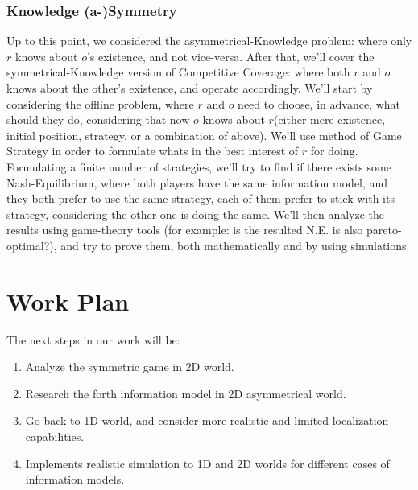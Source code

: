 \documentclass[a4paper,english,10pt]{article}
\newcommand\rob{\ensuremath{r}\xspace}
\newcommand\opp{\ensuremath{o}\xspace}
\begin{document}
\subsubsection{Knowledge (a-)Symmetry}
Up to this point, we considered the asymmetrical-Knowledge problem: where only \rob knows about \opp's existence, and not vice-versa. 
After that, we'll cover the symmetrical-Knowledge version of Competitive Coverage: where both \rob and \opp knows about the other's existence, and operate accordingly.
We'll start by considering the offline problem, where \rob and \opp need to choose, in advance, what should they do, considering that now \opp knows about \rob (either mere existence, initial position, strategy, or a combination of above).
We'll use method of Game Strategy in order to formulate whats in the best interest of \rob for doing. Formulating a finite number of strategies, we'll try to find if there exists some Nash-Equilibrium, where both players have the same information model, and they both prefer to use the same strategy, each of them prefer to stick with its strategy, considering the other one is doing the same. We'll then analyze the results using game-theory tools (for example: is the resulted N.E. is also pareto-optimal?), and try to prove them, both mathematically and by using simulations.

\section{Work Plan}
The next steps in our work will be:
\begin{enumerate}
\item Analyze the symmetric game in 2D world.
\item Research the forth information model in 2D asymmetrical world.
\item Go back to 1D world, and consider more realistic and limited localization capabilities.
\item Implements realistic simulation to 1D and 2D worlds for different cases of information models.
\end{enumerate}




\end{document}
